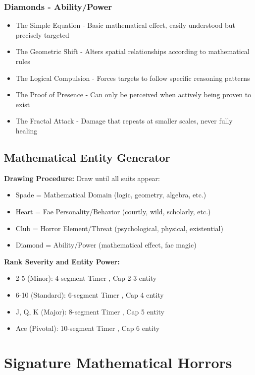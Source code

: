 \documentclass[11pt]{article}
\begin{document}
\subsubsection{Diamonds - Ability/Power}

\begin{itemize}
\item The Simple Equation - Basic mathematical effect, easily understood but precisely targeted
\item The Geometric Shift - Alters spatial relationships according to mathematical rules
\item The Logical Compulsion - Forces targets to follow specific reasoning patterns
\item The Proof of Presence - Can only be perceived when actively being proven to exist
\item The Fractal Attack - Damage that repeats at smaller scales, never fully healing
\end{itemize}

\subsection{Mathematical Entity Generator}

\textbf{Drawing Procedure:} Draw until all suits appear:
\begin{itemize}
\item Spade = Mathematical Domain (logic, geometry, algebra, etc.)
\item Heart = Fae Personality/Behavior (courtly, wild, scholarly, etc.)
\item Club = Horror Element/Threat (psychological, physical, existential)
\item Diamond = Ability/Power (mathematical effect, fae magic)
\end{itemize}

\textbf{Rank Severity and Entity Power:}
\begin{itemize}
\item 2-5 (Minor): 4-segment Timer , Cap 2-3 entity
\item 6-10 (Standard): 6-segment Timer , Cap 4 entity
\item J, Q, K (Major): 8-segment Timer , Cap 5 entity
\item Ace (Pivotal): 10-segment Timer , Cap 6 entity
\end{itemize}

\section{Signature Mathematical Horrors}
\end{document}
